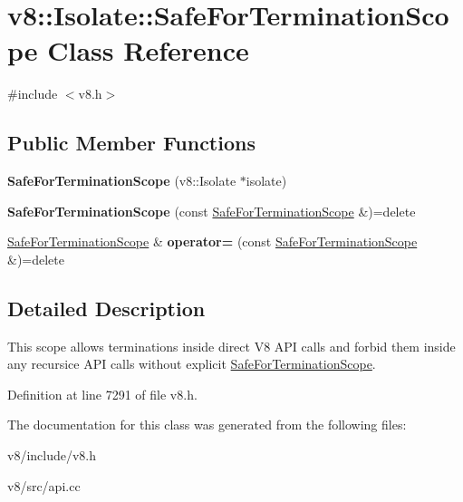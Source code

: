 \hypertarget{classv8_1_1Isolate_1_1SafeForTerminationScope}{}\section{v8\+:\+:Isolate\+:\+:Safe\+For\+Termination\+Scope Class Reference}
\label{classv8_1_1Isolate_1_1SafeForTerminationScope}


{\ttfamily \#include $<$v8.\+h$>$}

\subsection*{Public Member Functions}
\begin{DoxyCompactItemize}
\item 
\mbox{\label{classv8_1_1Isolate_1_1SafeForTerminationScope_aa68b3979df8fef65b1e7afa9cd9bba03}} 
{\bfseries Safe\+For\+Termination\+Scope} (v8\+::\+Isolate $\ast$isolate)
\item 
\mbox{\label{classv8_1_1Isolate_1_1SafeForTerminationScope_aa7041e87a889e8d4d8cdbca6b5adfa0d}} 
{\bfseries Safe\+For\+Termination\+Scope} (const \mbox{\hyperlink{classv8_1_1Isolate_1_1SafeForTerminationScope}{Safe\+For\+Termination\+Scope}} \&)=delete
\item 
\mbox{\label{classv8_1_1Isolate_1_1SafeForTerminationScope_ab4425468e50b70e5f0b8a7f438e609fa}} 
\mbox{\hyperlink{classv8_1_1Isolate_1_1SafeForTerminationScope}{Safe\+For\+Termination\+Scope}} \& {\bfseries operator=} (const \mbox{\hyperlink{classv8_1_1Isolate_1_1SafeForTerminationScope}{Safe\+For\+Termination\+Scope}} \&)=delete
\end{DoxyCompactItemize}


\subsection{Detailed Description}
This scope allows terminations inside direct V8 A\+PI calls and forbid them inside any recursice A\+PI calls without explicit \mbox{\hyperlink{classv8_1_1Isolate_1_1SafeForTerminationScope}{Safe\+For\+Termination\+Scope}}. 

Definition at line 7291 of file v8.\+h.



The documentation for this class was generated from the following files\+:\begin{DoxyCompactItemize}
\item 
v8/include/v8.\+h\item 
v8/src/api.\+cc\end{DoxyCompactItemize}
